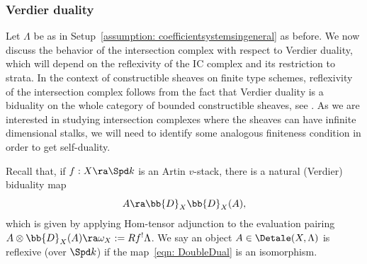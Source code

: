 \documentclass[letterpaper,11pt]{amsart}
\begin{document}
\subsubsection{Verdier duality}
Let $\Lambda$ be as in Setup~\ref{assumption: coefficientsystemsingeneral} as before. We now discuss the behavior of the intersection complex with respect to Verdier duality, which will depend on the reflexivity of the IC complex and its restriction to strata. In the context of constructible sheaves on finite type schemes, reflexivity of the intersection complex follows from the fact that Verdier duality is a biduality on the whole category of bounded constructible sheaves, see \cite[Th\'eor\`eme 6.1.1]{TravauxdeGabberXVII}. As we are interested in studying intersection complexes where the sheaves can have infinite dimensional stalks, we will need to identify some analogous finiteness condition in order to get self-duality. 

Recall that, if $f:X \ra\Spd k$ is an Artin $v$-stack, there is a natural (Verdier) biduality map 
\begin{equation}{\label{eqn: DoubleDual}}
 A \ra \bb{D}_{X}\bb{D}_{X}(A), 
\end{equation}
which is given by applying Hom-tensor adjunction to the evaluation pairing $A \otimes \bb{D}_{X}(A) \ra \omega_X:=Rf^{!}\Lambda$. We say an object $A\in \Detale(X,\Lambda)$ is reflexive (over $\Spd k$) if the map~\eqref{eqn: DoubleDual} is an isomorphism. 
\end{document}
